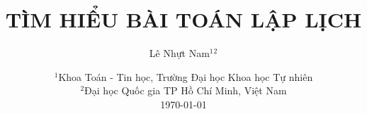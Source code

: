 \documentclass[a4paper]{report}
\title{TÌM HIỂU BÀI TOÁN LẬP LỊCH}
\author{Lê Nhựt Nam$^1$$^2$}
\date{
    $^1$Khoa Toán - Tin học, Trường Đại học Khoa học Tự nhiên\\%
    $^2$Đại học Quốc gia TP Hồ Chí Minh, Việt Nam\\%
    \vfill
    \today
}
\begin{document}
    \maketitle
    \tableofcontents

    \nocite{*}
\end{document}
